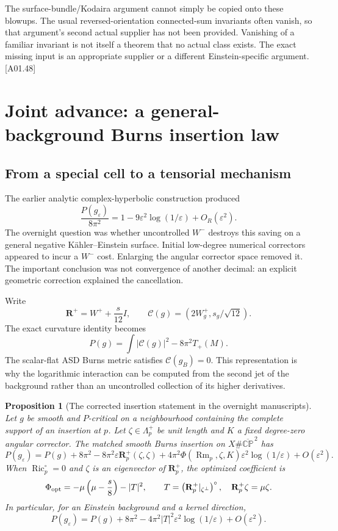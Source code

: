 \documentclass[11pt]{article}
\newcommand{\Ric}{\operatorname{Ric}}
\newcommand{\Rm}{\operatorname{Rm}}
\newcommand{\CP}{\mathbb{CP}}
\newcommand{\Rplus}{\mathbf R^+}
\newcommand{\sref}[1]{\textsf{[#1]}}
\newtheorem{proposition}{Proposition}[section]
\theoremstyle{remark}
\begin{document}
The surface-bundle/Kodaira argument cannot simply be copied onto these
blowups. The usual reversed-orientation connected-sum invariants often
vanish, so that argument's second actual supplier has not been provided.
Vanishing of a familiar invariant is not itself a theorem that no actual
class exists. The exact missing input is an appropriate supplier or a
different Einstein-specific argument. \sref{A01.48}

\section{Joint advance: a general-background Burns insertion law}
\label{sec:burns}

\subsection{From a special cell to a tensorial mechanism}
The earlier analytic complex-hyperbolic construction produced
\[
 \frac{P(g_\varepsilon)}{8\pi^2}
 =1-9\varepsilon^2\log(1/\varepsilon)+O_R(\varepsilon^2).
\]
The overnight question was whether uncontrolled $W^-$ destroys this saving
on a general negative K\"ahler--Einstein surface. Initial low-degree
numerical correctors appeared to incur a $W^-$ cost. Enlarging the angular
corrector space removed it. The important conclusion was not convergence
of another decimal: an explicit geometric correction explained the
cancellation.

Write
\[
 \Rplus=W^++\frac{s}{12}I,\qquad
 \mathscr C(g)=(2W_g^+,s_g/\sqrt{12}).
\]
The exact curvature identity becomes
\[
 P(g)=\int|\mathscr C(g)|^2-8\pi^2T_+(M).
\]
The scalar-flat ASD Burns metric satisfies $\mathscr C(g_B)=0$.
This representation is why the logarithmic interaction can be computed
from the second jet of the background rather than an uncontrolled collection
of its higher derivatives.

\begin{proposition}[The corrected insertion statement in the overnight manuscripts]
Let $g$ be smooth and $P$-critical on a neighbourhood containing the complete
support of an insertion at $p$. Let $\zeta\in\Lambda_p^+$ be unit length and
$K$ a fixed degree-zero angular corrector. The matched smooth Burns insertion
on $X\#\overline{\CP}^{\,2}$ has
\begin{equation}
 P(g_\varepsilon)=P(g)+8\pi^2
 -8\pi^2\varepsilon\Rplus_p(\zeta,\zeta)
 +4\pi^2\Phi(\Rm_p,\zeta,K)\varepsilon^2\log(1/\varepsilon)
 +O(\varepsilon^2).\label{eq:insertion}
\end{equation}
When $\Ric_p^\circ=0$ and $\zeta$ is an eigenvector of $\Rplus_p$,
the optimized coefficient is
\begin{equation}
 \Phi_{\rm opt}=-\mu\left(\mu-\frac s8\right)-|T|^2,
 \qquad T=\left(\Rplus_p|_{\zeta^\perp}\right)^\circ,
 \quad\Rplus_p\zeta=\mu\zeta.\label{eq:phi}
\end{equation}
In particular, for an Einstein background and a kernel direction,
\begin{equation}
 P(g_\varepsilon)=P(g)+8\pi^2
 -4\pi^2|T|^2\varepsilon^2\log(1/\varepsilon)+O(\varepsilon^2).
 \label{eq:kernel}
\end{equation}
\end{proposition}
\end{document}
